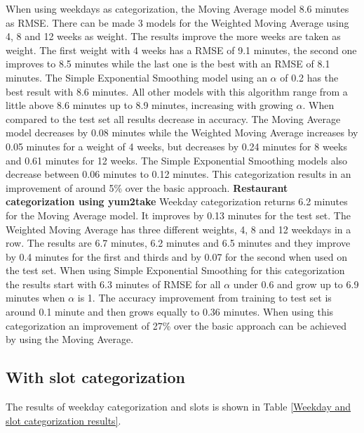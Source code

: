 When using weekdays as categorization, the Moving Average model 8.6 minutes as RMSE. There can be made 3 models for the Weighted Moving Average using 4, 8 and 12 weeks as weight. The results improve the more weeks are taken as weight. The first weight with 4 weeks has a RMSE of 9.1 minutes, the second one improves to 8.5 minutes while the last one is the best with an RMSE of 8.1 minutes. The Simple Exponential Smoothing model using an $\alpha$ of 0.2 has the best result with 8.6 minutes. All other models with this algorithm range from a little above 8.6 minutes up to 8.9 minutes, increasing with growing $\alpha$. When compared to the test set all results decrease in accuracy. The Moving Average model decreases by 0.08 minutes while the Weighted Moving Average increases by 0.05 minutes for a weight of 4 weeks, but decreases by 0.24 minutes for 8 weeks and 0.61 minutes for 12 weeks. The Simple Exponential Smoothing models also decrease between 0.06 minutes to 0.12 minutes.\newline
This categorization results in an improvement of around 5\% over the basic approach.
\newline\newline\textbf{Restaurant categorization using yum2take}\newline
Weekday categorization returns 6.2 minutes for the Moving Average model. It improves by 0.13 minutes for the test set. The Weighted Moving Average has three different weights, 4, 8 and 12 weekdays in a row. The results are 6.7 minutes, 6.2 minutes and 6.5 minutes and they improve by 0.4 minutes for the first and thirds and by 0.07 for the second when used on the test set. When using Simple Exponential Smoothing for this categorization the results start with 6.3 minutes of RMSE for all $\alpha$ under 0.6 and grow up to 6.9 minutes when $\alpha$ is 1. The accuracy improvement from training to test set is around 0.1 minute and then grows equally to 0.36 minutes.\newline
When using this categorization an improvement of 27\% over the basic approach can be achieved by using the Moving Average.
\subsection{With slot categorization}
The results of weekday categorization and slots is shown in Table \ref{Weekday and slot categorization results}.

